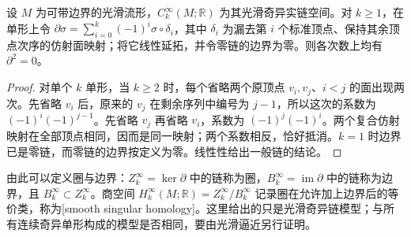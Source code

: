 \begin{lemma}
	\label{g1:lem:smooth-chain-boundary-square}
	设 \(M\) 为可带边界的光滑流形，\(C_k^\infty(M;\mathbb R)\) 为其光滑奇异实链空间。对 \(k\ge1\)，在单形上令 \(\partial\sigma=\sum_{i=0}^k(-1)^i\sigma\circ\delta_i\)，其中 \(\delta_i\) 为漏去第 \(i\) 个标准顶点、保持其余顶点次序的仿射面映射；将它线性延拓，并令零链的边界为零。则各次数上均有 \(\partial^2=0\)。
\end{lemma}
\begin{proof}
	对单个 \(k\) 单形，当 \(k\geq2\) 时，每个省略两个原顶点 \(v_i,v_j\)、\(i<j\) 的面出现两次。先省略 \(v_i\) 后，原来的 \(v_j\) 在剩余序列中编号为 \(j-1\)，所以这次的系数为 \((-1)^i(-1)^{j-1}\)。先省略 \(v_j\) 再省略 \(v_i\)，系数为 \((-1)^j(-1)^i\)。两个复合仿射映射在全部顶点相同，因而是同一映射；两个系数相反，恰好抵消。\(k=1\) 时边界已是零链，而零链的边界按定义为零。线性性给出一般链的结论。
\end{proof}

由此可以定义圈与边界：\(Z_k^\infty=\ker\partial\) 中的链称为圈，\(B_k^\infty=\operatorname{im}\partial\) 中的链称为边界，且 \(B_k^\infty\subset Z_k^\infty\)。商空间 \(H_k^\infty(M;\mathbb R)=Z_k^\infty/B_k^\infty\) 记录圈在允许加上边界后的等价类，称为[smooth singular homology]。这里给出的只是光滑奇异链模型；与所有连续奇异单形构成的模型是否相同，要由光滑逼近另行证明。

